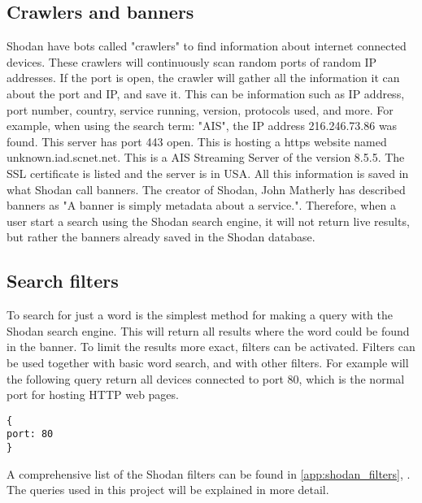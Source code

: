 \subsection{Crawlers and banners}
Shodan have bots called "crawlers" to find information about internet connected devices. These crawlers will continuously scan random ports of random IP addresses. If the port is open, the crawler will gather all the information it can about the port and IP, and save it. This can be information such as IP address, port number, country, service running, version, protocols used, and more. 
For example, when using the search term: "AIS", the IP address 216.246.73.86 was found. This server has port 443 open. This is hosting a https website named unknown.iad.scnet.net. This is a AIS Streaming Server of the version 8.5.5. The SSL certificate is listed and the server is in USA.
All this information is saved in what Shodan call banners. The creator of Shodan, John Matherly has described banners as "A banner is simply metadata about a service.". \cite{banner} 
Therefore, when a user start a search using the Shodan search engine, it will not return live results, but rather the banners already saved in the Shodan database. 

\subsection{Search filters}
To search for just a word is the simplest method for making a query with the Shodan search engine. This will return all results where the word could be found in the banner. To limit the results more exact, filters can be activated. Filters can be used together with basic word search, and with other filters. For example will the following query return all devices connected to port 80, which is the normal port for hosting HTTP web pages. 

\begin{lstlisting}
{
port: 80
}
\end{lstlisting}

A comprehensive list of the Shodan filters can be found in \cref{app:shodan_filters}, . The queries used in this project will be explained in more detail. 


